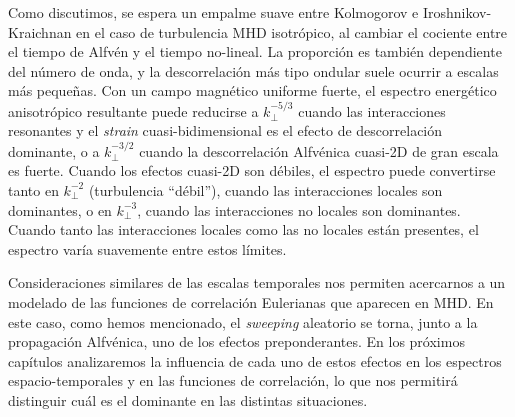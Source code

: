 Como discutimos, se espera un empalme suave entre Kolmogorov e
Iroshnikov-Kraichnan en el caso de turbulencia MHD isotrópico, al
cambiar el cociente entre el tiempo de Alfv\'en y el tiempo
no-lineal. La proporción es también dependiente del número de onda, y
la descorrelación más tipo ondular suele ocurrir a escalas más
pequeñas. Con un campo magnético uniforme fuerte, el espectro
energético anisotrópico resultante puede reducirse a $k_\perp^{-5/3}$
cuando las interacciones resonantes y el \textit{strain}
cuasi-bidimensional es el efecto de descorrelación dominante, o a
$k_\perp^{-3/2}$ cuando la descorrelación Alfv\'enica cuasi-2D de gran
escala es fuerte. Cuando los efectos cuasi-2D son débiles, el espectro
puede convertirse tanto en $k_\perp^{-2}$ (turbulencia ``débil''),
cuando las interacciones locales son dominantes, o en $k_\perp^{-3}$,
cuando las interacciones no locales son dominantes. Cuando tanto las
interacciones locales como las no locales están presentes, el espectro
varía suavemente entre estos límites.

Consideraciones similares de las escalas temporales nos permiten
acercarnos a un modelado de las funciones de correlación Eulerianas
que aparecen en MHD. En este caso, como hemos mencionado,
el \textit{sweeping} aleatorio se torna, junto a la propagación
Alfv\'enica, uno de los efectos preponderantes. En los próximos capítulos
analizaremos la influencia de cada uno de estos efectos en los espectros
espacio-temporales y en las funciones de correlación, lo que nos permitirá
distinguir cuál es el dominante en las distintas situaciones.

